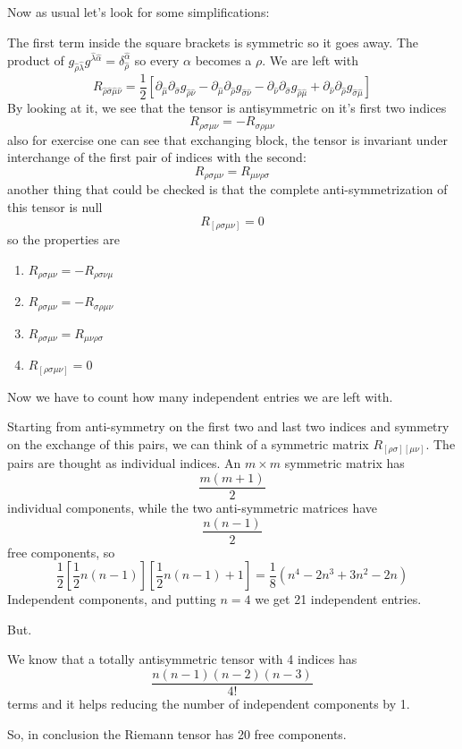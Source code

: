 Now as usual let's look for some simplifications: \par
The first term inside the square brackets is symmetric so it goes away. The product of $g_{\hat{\rho }\hat{\lambda }} g^{\hat{\lambda }\hat{\alpha }} = \delta ^{\hat{\alpha }}_{\hat{\rho }} $ so every $\alpha $ becomes a $\rho $. We are left with
\begin{equation}
	R_{\hat{\rho }\hat{\sigma }\hat{\mu }\hat{\nu }} = \frac{1}{2} [\partial_{\hat{\mu }}\partial_{\hat{\sigma }} g_{\hat{\rho }\hat{\nu }} - \partial_{\hat{\mu }}\partial_{\hat{\rho }}g_{\hat{\sigma }\hat{\nu }} - \partial_{\hat{\nu }}\partial_{\hat{\sigma }} g_{\hat{\rho }\hat{\mu }}+ \partial_{\hat{\nu }}\partial_{\hat{\rho }}g_{\hat{\sigma }\hat{\mu }}]
\end{equation}
By looking at it, we see that the tensor is antisymmetric on it's first two indices
\[
R_{\rho \sigma \mu \nu } = - R_{\sigma \rho \mu \nu }
\]
also for exercise one can see that exchanging block, the tensor is invariant under interchange of the first pair of indices with the second:
\[
R_{\rho \sigma \mu \nu } = R_{\mu \nu \rho \sigma }
\]
another thing that could be checked is that the complete anti-symmetrization of this tensor is null
\[
	R_{[\rho \sigma \mu \nu ]} = 0
\]
so the properties are
\begin{enumerate}
\item $R_{\rho \sigma \mu \nu }  = - R_{\rho \sigma \nu \mu }$
\item $R_{\rho \sigma \mu \nu } = - R_{\sigma \rho \mu \nu }$
\item $R_{\rho \sigma \mu \nu } = R_{\mu \nu \rho \sigma }$
\item $R_{[\rho \sigma \mu \nu ]} = 0$
\end{enumerate}
Now we have to count how many independent entries we are left with.\par
Starting from anti-symmetry on the first two and last two indices and symmetry on the exchange of this pairs, we can think of a symmetric matrix $R_{[\rho \sigma ][\mu \nu ]}$. The pairs are thought as individual indices. An $m\times m$ symmetric matrix has 
\[
\frac{m\left( m+1 \right)}{2}
\]
individual components, while the two anti-symmetric matrices have
\[
\frac{n\left( n-1 \right)}{2}
\]
free components, so
\[
	\frac{1}{2} \left[ \frac{1}{2} n\left( n-1 \right)\right] \left[ \frac{1}{2} n \left( n-1 \right)+1\right] = \frac{1}{8} \left( n^{4} -2n^{3} +3n^{2} -2n \right)
\]
Independent components, and putting $n=4$ we get 21 independent entries. \par
But.\par
We know that a totally antisymmetric tensor with 4 indices has
\[
\frac{n\left( n-1 \right)\left( n-2 \right)\left( n-3 \right)}{4!}
\]
terms and it helps reducing the number of independent components by 1.\par
So, in conclusion the Riemann tensor has 20 free components.\par
